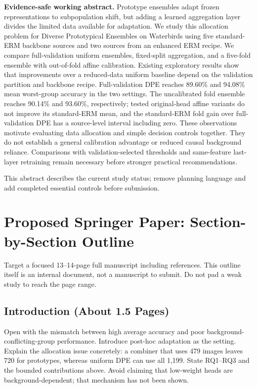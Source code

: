 \documentclass[runningheads]{llncs}
\begin{document}
\textbf{Evidence-safe working abstract.}
Prototype ensembles adapt frozen representations to subpopulation shift, but adding a learned aggregation layer divides the limited data available for adaptation. We study this allocation problem for Diverse Prototypical Ensembles on Waterbirds using five standard-ERM backbone sources and two sources from an enhanced ERM recipe. We compare full-validation uniform ensembles, fixed-split aggregation, and a five-fold ensemble with out-of-fold affine calibration. Existing exploratory results show that improvements over a reduced-data uniform baseline depend on the validation partition and backbone recipe. Full-validation DPE reaches 89.60\% and 94.08\% mean worst-group accuracy in the two settings. The uncalibrated fold ensemble reaches 90.14\% and 93.60\%, respectively; tested original-head affine variants do not improve its standard-ERM mean, and the standard-ERM fold gain over full-validation DPE has a source-level interval including zero. These observations motivate evaluating data allocation and simple decision controls together. They do not establish a general calibration advantage or reduced causal background reliance. Comparisons with validation-selected thresholds and same-feature last-layer retraining remain necessary before stronger practical recommendations.

\noindent This abstract describes the current study status; remove planning language and add completed essential controls before submission.


\section{Proposed Springer Paper: Section-by-Section Outline}
Target a focused 13--14-page full manuscript including references. This outline itself is an internal document, not a manuscript to submit. Do not pad a weak study to reach the page range.

\subsection{Introduction (About 1.5 Pages)}
Open with the mismatch between high average accuracy and poor background-conflicting-group performance. Introduce post-hoc adaptation as the setting. Explain the allocation issue concretely: a combiner that uses 479 images leaves 720 for prototypes, whereas uniform DPE can use all 1,199. State RQ1--RQ3 and the bounded contributions above. Avoid claiming that low-weight heads are background-dependent; that mechanism has not been shown.
\end{document}
